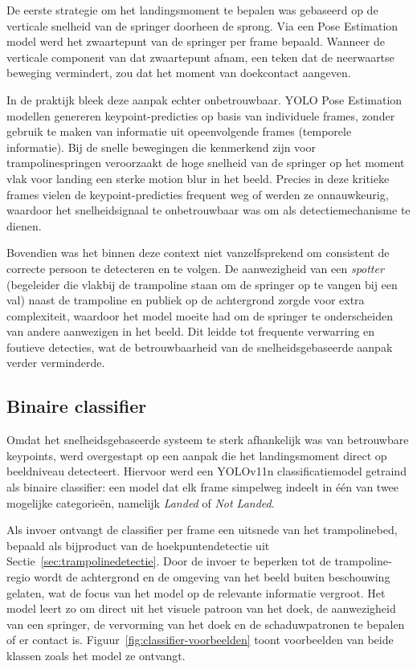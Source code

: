 De eerste strategie om het landingsmoment te bepalen was gebaseerd op de verticale snelheid van de springer doorheen de sprong. Via een Pose Estimation model werd het zwaartepunt van de springer per frame bepaald. Wanneer de verticale component van dat zwaartepunt afnam, een teken dat de neerwaartse beweging vermindert, zou dat het moment van doekcontact aangeven.


In de praktijk bleek deze aanpak echter onbetrouwbaar. YOLO Pose Estimation modellen genereren keypoint-predicties op basis van individuele frames, zonder gebruik te maken van informatie uit opeenvolgende frames (temporele informatie). Bij de snelle bewegingen die kenmerkend zijn voor trampolinespringen veroorzaakt de hoge snelheid van de springer op het moment vlak voor landing een sterke motion blur in het beeld. Precies in deze kritieke frames vielen de keypoint-predicties frequent weg of werden ze onnauwkeurig, waardoor het snelheidsignaal te onbetrouwbaar was om als detectiemechanisme te dienen.

Bovendien was het binnen deze context niet vanzelfsprekend om consistent de correcte persoon te detecteren en te volgen. De aanwezigheid van een \textit{spotter} (begeleider die vlakbij de trampoline staan om de springer op te vangen bij een val) naast de trampoline en publiek op de achtergrond zorgde voor extra complexiteit, waardoor het model moeite had om de springer te onderscheiden van andere aanwezigen in het beeld. Dit leidde tot frequente verwarring en foutieve detecties, wat de betrouwbaarheid van de snelheidsgebaseerde aanpak verder verminderde.

\subsection{Binaire classifier}
\label{subsec:landingsmoment-classifier}

Omdat het snelheidsgebaseerde systeem te sterk afhankelijk was van betrouwbare keypoints, werd overgestapt op een aanpak die het landingsmoment direct op beeldniveau detecteert. Hiervoor werd een YOLOv11n classificatiemodel \autocite{Jocher_Ultralytics_YOLO_2023} getraind als binaire classifier: een model dat elk frame simpelweg indeelt in één van twee mogelijke categorieën, namelijk \textit{Landed} of \textit{Not Landed}.

Als invoer ontvangt de classifier per frame een uitsnede van het trampolinebed, bepaald als bijproduct van de hoekpuntendetectie uit Sectie~\ref{sec:trampolinedetectie}. Door de invoer te beperken tot de trampoline-regio wordt de achtergrond en de omgeving van het beeld buiten beschouwing gelaten, wat de focus van het model op de relevante informatie vergroot. Het model leert zo om direct uit het visuele patroon van het doek, de aanwezigheid van een springer, de vervorming van het doek en de schaduwpatronen te bepalen of er contact is. Figuur~\ref{fig:classifier-voorbeelden} toont voorbeelden van beide klassen zoals het model ze ontvangt.

